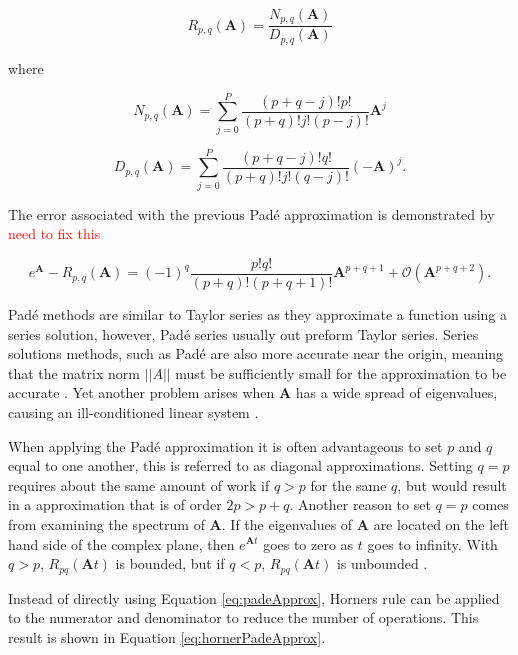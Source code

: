 \begin{equation}
    R_{p,q}(\boldsymbol{A}) = \frac{N_{p,q}(\boldsymbol{A})}{D_{p,q}(\boldsymbol{A})}
    \label{eq:padeApprox}
\end{equation}

\noindent where

\begin{equation*}
    N_{p,q}(\boldsymbol{A}) = \sum_{j=0}^{P}\frac{(p + q - j)!p!}{(p + q)!j!(p - j)!}\boldsymbol{A}^{j}
\end{equation*}

\begin{equation*}
    D_{p,q}(\boldsymbol{A}) = \sum_{j=0}^{P}\frac{(p + q - j)!q!}{(p + q)!j!(q - j)!}(-\boldsymbol{A})^{j}.
\end{equation*}

\noindent The error associated with the previous Pad\'e approximation is demonstrated by \cite{higham2005} \textcolor{red}{need to fix this}

\begin{equation}
    e^{\boldsymbol{A}} - R_{p,q}(\boldsymbol{A}) = (-1)^{q}\frac{p!q!}{(p+q)!(p+q+1)!}\boldsymbol{A}^{p+q+1} + \mathcal{O}(\boldsymbol{A}^{p+q+2}).
\end{equation}

Pad\'e methods are similar to Taylor series as they approximate a function using a series solution, however, Pad\'e series usually out preform Taylor series. Series solutions methods, such as Pad\'e are also more accurate near the origin, meaning that the matrix norm $||A||$ must be sufficiently small for the approximation to be accurate \cite{pusa2010}. Yet another problem arises when $\boldsymbol{A}$ has a wide spread of eigenvalues, causing an ill-conditioned linear system  \cite{exokit} \cite{moler2003}.  

When applying the Pad\'e approximation it is often advantageous to set $p$ and $q$ equal to one another, this is referred to as diagonal approximations. Setting $q = p$ requires about the same amount of work if $q > p$ for the same $q$, but would result in a approximation that is of order $2p > p + q$. Another reason to set $q=p$ comes from examining the spectrum of $\boldsymbol{A}$. If the eigenvalues of $\boldsymbol{A}$ are located on the left hand side of the complex plane, then $e^{\boldsymbol{A}t}$ goes to zero as $t$ goes to infinity. With $q > p$, $R_{pq}(\boldsymbol{A}t)$ is bounded, but if $q < p$, $R_{pq}(\boldsymbol{A}t)$ is unbounded \cite{moler2003}. 


Instead of directly using Equation \ref{eq:padeApprox}, Horners rule can be applied to the numerator and denominator to reduce the number of operations. This result is shown in Equation \ref{eq:hornerPadeApprox}. 

